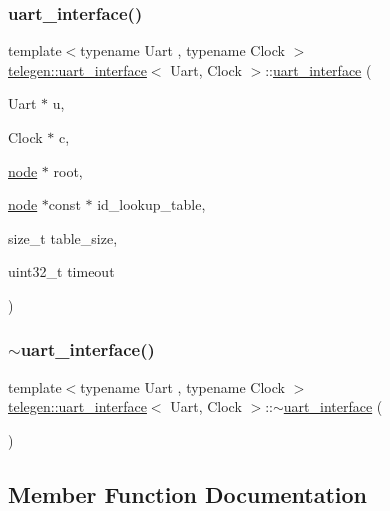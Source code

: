 \subsubsection{\texorpdfstring{uart\+\_\+interface()}{uart\_interface()}}
{\footnotesize\ttfamily template$<$typename Uart , typename Clock $>$ \\
\hyperlink{classtelegen_1_1uart__interface}{telegen\+::uart\+\_\+interface}$<$ Uart, Clock $>$\+::\hyperlink{classtelegen_1_1uart__interface}{uart\+\_\+interface} (\begin{DoxyParamCaption}\item[{Uart $\ast$}]{u,  }\item[{Clock $\ast$}]{c,  }\item[{\hyperlink{classtelegen_1_1node}{node} $\ast$}]{root,  }\item[{\hyperlink{classtelegen_1_1node}{node} $\ast$const $\ast$}]{id\+\_\+lookup\+\_\+table,  }\item[{size\+\_\+t}]{table\+\_\+size,  }\item[{uint32\+\_\+t}]{timeout }\end{DoxyParamCaption})\hspace{0.3cm}{\ttfamily [inline]}}

\mbox{\label{classtelegen_1_1uart__interface_a32429e63defd2d534b5d881eeff8c35c}} 
\subsubsection{\texorpdfstring{$\sim$uart\+\_\+interface()}{~uart\_interface()}}
{\footnotesize\ttfamily template$<$typename Uart , typename Clock $>$ \\
\hyperlink{classtelegen_1_1uart__interface}{telegen\+::uart\+\_\+interface}$<$ Uart, Clock $>$\+::$\sim$\hyperlink{classtelegen_1_1uart__interface}{uart\+\_\+interface} (\begin{DoxyParamCaption}{ }\end{DoxyParamCaption})\hspace{0.3cm}{\ttfamily [inline]}}



\subsection{Member Function Documentation}
\mbox{\label{classtelegen_1_1uart__interface_acaf4ff8f9442b3d4d2b9d5bcc252d08e}} 
